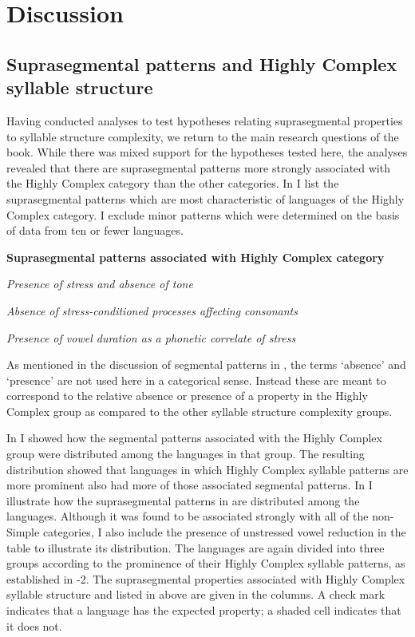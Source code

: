 \section{Discussion}\label{sec:5.5}
\subsection{Suprasegmental patterns and Highly Complex syllable structure}\label{sec:5.5.1}

  Having conducted analyses to test hypotheses relating suprasegmental properties to syllable structure complexity, we return to the main research questions of the book. While there was mixed support for the hypotheses tested here, the analyses revealed that there are suprasegmental patterns more strongly associated with the Highly Complex category than the other categories. In  I list the suprasegmental patterns which are most characteristic of languages of the Highly Complex category. I exclude minor patterns which were determined on the basis of data from ten or fewer languages.

\ea\label{ex:5.27}
  \textbf{Suprasegmental patterns associated with Highly Complex category}

\textit{Presence of stress and absence of tone}

\textit{Absence of stress-conditioned processes affecting consonants}

\textit{Presence of vowel duration as a phonetic correlate of stress}
\z

  As mentioned in the discussion of segmental patterns in , the terms ‘absence’ and ‘presence’ are not used here in a categorical sense. Instead these are meant to correspond to the relative absence or presence of a property in the Highly Complex group as compared to the other syllable structure complexity groups.

  In  I showed how the segmental patterns associated with the Highly Complex group were distributed among the languages in that group. The resulting distribution showed that languages in which Highly Complex syllable patterns are more prominent also had more of those associated segmental patterns. In  I illustrate how the suprasegmental patterns in  are distributed among the languages. Although it was found to be associated strongly with all of the non-Simple categories, I also include the presence of unstressed vowel reduction in the table to illustrate its distribution. The languages are again divided into three groups according to the prominence of their Highly Complex syllable patterns, as established in -2. The suprasegmental properties associated with Highly Complex syllable structure and listed in  above are given in the columns. A check mark indicates that a language has the expected property; a shaded cell indicates that it does not. 

